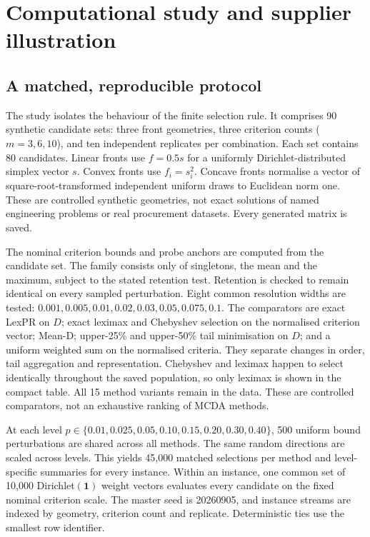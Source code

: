 \section{Computational study and supplier illustration}
\label{sec:experiments}
\subsection{A matched, reproducible protocol}
The study isolates the behaviour of the finite selection rule. It comprises 90 synthetic candidate sets: three front geometries, three criterion counts ($m=3,6,10$), and ten independent replicates per combination. Each set contains 80 candidates. Linear fronts use $f=0.5s$ for a uniformly Dirichlet-distributed simplex vector $s$. Convex fronts use $f_i=s_i^2$. Concave fronts normalise a vector of square-root-transformed independent uniform draws to Euclidean norm one. These are controlled synthetic geometries, not exact solutions of named engineering problems or real procurement datasets. Every generated matrix is saved.

The nominal criterion bounds and probe anchors are computed from the candidate set. The family consists only of singletons, the mean and the maximum, subject to the stated retention test. Retention is checked to remain identical on every sampled perturbation. Eight common resolution widths are tested: $0.001,0.005,0.01,0.02,0.03,0.05,0.075,0.1$. The comparators are exact LexPR on $D$; exact leximax and Chebyshev selection on the normalised criterion vector; Mean-D; upper-25\% and upper-50\% tail minimisation on $D$; and a uniform weighted sum on the normalised criteria. They separate changes in order, tail aggregation and representation. Chebyshev and leximax happen to select identically throughout the saved population, so only leximax is shown in the compact table. All 15 method variants remain in the data. These are controlled comparators, not an exhaustive ranking of MCDA methods.

At each level $p\in\{0.01,0.025,0.05,0.10,0.15,0.20,0.30,0.40\}$, 500 uniform bound perturbations are shared across all methods. The same random directions are scaled across levels. This yields 45,000 matched selections per method and level-specific summaries for every instance. Within an instance, one common set of 10,000 Dirichlet$(\mathbf1)$ weight vectors evaluates every candidate on the fixed nominal criterion scale. The master seed is 20260905, and instance streams are indexed by geometry, criterion count and replicate. Deterministic ties use the smallest row identifier.

